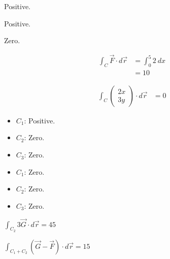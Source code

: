 \documentclass[8pt]{extarticle}
\title{}
\author{}
\date{}
\begin{document}
\renewcommand{\arraystretch}{1.5}
  \begin{problem}{18.1}
    \begin{description}[font=\normalfont]
      \item[2:] Positive.
      \item[4:] Positive.
      \item[6:] Zero.
      \item[8:]
        \begin{align*}
          \int_{C}\vec{F}\cdot d\vec{r} &= \int_{0}^{5} 2~dx\\
                                        &= 10
        \end{align*}
      \item[20:]
        \begin{align*}
          \int_{C} \begin{pmatrix}2x\\3y\end{pmatrix}\cdot d\vec{r} &= 0
        \end{align*}
      \item[28:]\hfill
        \begin{itemize}
          \item $C_1$: Positive.
          \item $C_2$: Zero.
          \item $C_3$: Zero.
        \end{itemize}
      \item[30:]\hfill
        \begin{itemize}
          \item $C_1$: Zero.
          \item $C_2$: Zero.
          \item $C_3$: Zero.
        \end{itemize}
      \item[48:] $\int_{C_2}3\vec{G}\cdot d\vec{r} = 45$
      \item[50:] $\int_{C_1 + C_2}(\vec{G}-\vec{F})\cdot d\vec{r} = 15$
    \end{description}
  \end{problem}
\end{document}
